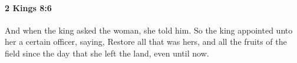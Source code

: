 
		\paragraph{2 Kings 8:6} %
			\label{2KINGS-8-6}

			And when the king asked the woman, she told him. So the king appointed unto her a certain officer, saying, Restore all that was hers, and all the fruits of the field since the day that she left the land, even until now.



